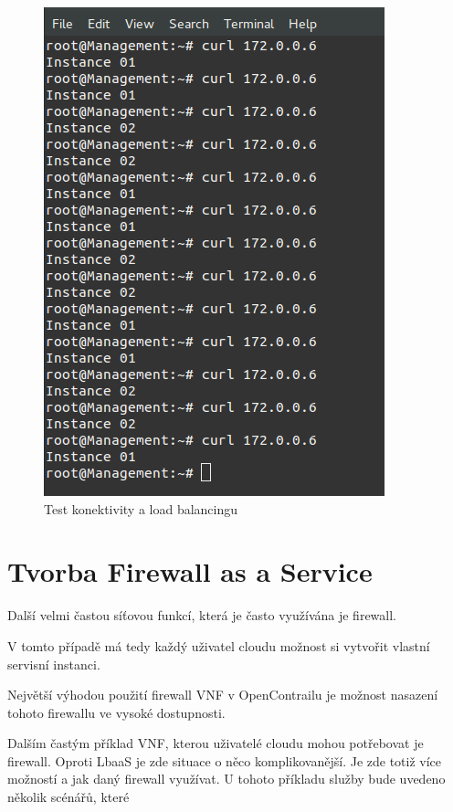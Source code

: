 \begin{figure}[h]
\begin{centering}
\includegraphics[scale=0.3]{images/lbaas_testing}
\par\end{centering}
\caption{Test konektivity a load balancingu\label{fig:lbaas_testing}}
\end{figure}


\section{Tvorba Firewall as a Service}

Další velmi častou síťovou funkcí, která je často využívána je firewall. 

V tomto případě má tedy každý uživatel cloudu možnost si vytvořit vlastní servisní instanci.  

Největší výhodou použití firewall VNF v OpenContrailu je možnost nasazení tohoto firewallu ve vysoké dostupnosti.

Dalším častým příklad VNF, kterou uživatelé cloudu mohou potřebovat je firewall. Oproti LbaaS je zde situace o něco komplikovanější. Je zde totiž více možností a jak daný firewall využívat. U tohoto příkladu služby bude uvedeno několik scénářů, které 

